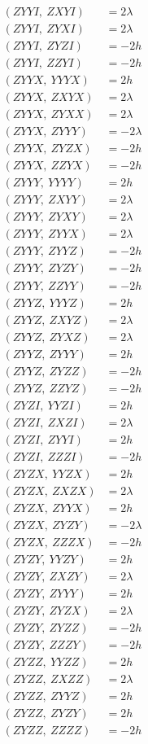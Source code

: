 \documentclass{article}
\begin{document}
\begin{align*}
  (ZYYI,\ ZXYI) &= 2 \lambda \\
  (ZYYI,\ ZYXI) &= 2 \lambda \\
  (ZYYI,\ ZYZI) &= - 2 h \\
  (ZYYI,\ ZZYI) &= - 2 h \\
  (ZYYX,\ YYYX) &= 2 h \\
  (ZYYX,\ ZXYX) &= 2 \lambda \\
  (ZYYX,\ ZYXX) &= 2 \lambda \\
  (ZYYX,\ ZYYY) &= - 2 \lambda \\
  (ZYYX,\ ZYZX) &= - 2 h \\
  (ZYYX,\ ZZYX) &= - 2 h \\
  (ZYYY,\ YYYY) &= 2 h \\
  (ZYYY,\ ZXYY) &= 2 \lambda \\
  (ZYYY,\ ZYXY) &= 2 \lambda \\
  (ZYYY,\ ZYYX) &= 2 \lambda \\
  (ZYYY,\ ZYYZ) &= - 2 h \\
  (ZYYY,\ ZYZY) &= - 2 h \\
  (ZYYY,\ ZZYY) &= - 2 h \\
  (ZYYZ,\ YYYZ) &= 2 h \\
  (ZYYZ,\ ZXYZ) &= 2 \lambda \\
  (ZYYZ,\ ZYXZ) &= 2 \lambda \\
  (ZYYZ,\ ZYYY) &= 2 h \\
  (ZYYZ,\ ZYZZ) &= - 2 h \\
  (ZYYZ,\ ZZYZ) &= - 2 h \\
  (ZYZI,\ YYZI) &= 2 h \\
  (ZYZI,\ ZXZI) &= 2 \lambda \\
  (ZYZI,\ ZYYI) &= 2 h \\
  (ZYZI,\ ZZZI) &= - 2 h \\
  (ZYZX,\ YYZX) &= 2 h \\
  (ZYZX,\ ZXZX) &= 2 \lambda \\
  (ZYZX,\ ZYYX) &= 2 h \\
  (ZYZX,\ ZYZY) &= - 2 \lambda \\
  (ZYZX,\ ZZZX) &= - 2 h \\
  (ZYZY,\ YYZY) &= 2 h \\
  (ZYZY,\ ZXZY) &= 2 \lambda \\
  (ZYZY,\ ZYYY) &= 2 h \\
  (ZYZY,\ ZYZX) &= 2 \lambda \\
  (ZYZY,\ ZYZZ) &= - 2 h \\
  (ZYZY,\ ZZZY) &= - 2 h \\
  (ZYZZ,\ YYZZ) &= 2 h \\
  (ZYZZ,\ ZXZZ) &= 2 \lambda \\
  (ZYZZ,\ ZYYZ) &= 2 h \\
  (ZYZZ,\ ZYZY) &= 2 h \\
  (ZYZZ,\ ZZZZ) &= - 2 h
\end{align*}
\end{document}

